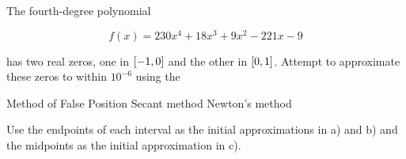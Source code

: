 \documentclass[../../../../Assignments]{subfiles}
\begin{document}
\begin{exercise}
    The fourth-degree polynomial

    \[f(x) = 230x^4 + 18x^3 + 9x^2 - 221x - 9\]

    \noindent has two real zeros, one in \(\interval{-1}{0}\) and the other in
    \(\interval{0}{1}\). Attempt to approximate these zeros to within
    \(10^{-6}\) using the

    \begin{tasks}
        \task Method of False Position
        \task Secant method
        \task Newton's method
    \end{tasks}

    Use the endpoints of each interval as the initial approximations in a) and
    b) and the midpoints as the initial approximation in c).
\end{exercise}
\end{document}
